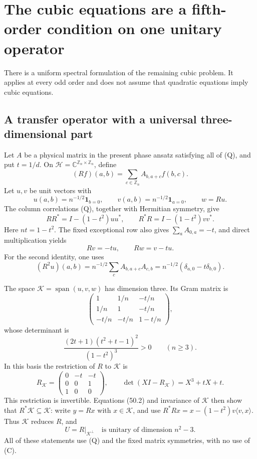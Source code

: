 \documentclass[11pt,reqno]{amsart}
\theoremstyle{plain}
\begin{document}
\section{The cubic equations are a fifth-order condition on one unitary operator}\label{sec:50}

There is a uniform spectral formulation of the remaining cubic
problem. It applies at every odd order and does not assume that
quadratic equations imply cubic equations.

\subsection{A transfer operator with a universal three-dimensional part}\label{sec:50.1}

Let \(A\) be a physical matrix in the present phase ansatz satisfying
all of (Q), and put \(t=1/d\). On
\(\mathcal H=\mathbb C^{\mathbb Z_n\times\mathbb Z_n}\), define
\begin{equation*}
 (Rf)(a,b)=\sum_{c\in\mathbb Z_n}A_{b,a+c}f(b,c).
 \tag{50.1}
\end{equation*}
Let \(u,v\) be unit vectors with
\[
 u(a,b)=n^{-1/2}\mathbf1_{b=0},
 \qquad v(a,b)=n^{-1/2}\mathbf1_{a=0},
 \qquad w=Ru.
\]
The column correlations (Q), together with Hermitian symmetry, give
\begin{equation*}
 RR^*=I-(1-t^2)uu^*,
 \qquad R^*R=I-(1-t^2)vv^*. \tag{50.2}
\end{equation*}
Here \(nt=1-t^2\). The fixed exceptional row also gives
\(\sum_a A_{0,a}=-t\), and direct multiplication yields
\begin{equation*}
 Rv=-tu,\qquad Rw=v-tu. \tag{50.3}
\end{equation*}
For the second identity, one uses
\[
 (R^2u)(a,b)=n^{-1/2}\sum_c A_{b,a+c}A_{c,b}
 =n^{-1/2}(\delta_{a,0}-t\delta_{b,0}).
\]

The space \(\mathcal K=\operatorname{span}(u,v,w)\) has dimension
three. Its Gram matrix is
\[
 \begin{pmatrix}
 1&1/n&-t/n\\
 1/n&1&-t/n\\
 -t/n&-t/n&1-t/n
 \end{pmatrix},
\]
whose determinant is
\[
 \frac{(2t+1)(t^2+t-1)^2}{(1-t^2)^3}>0
 \qquad(n\ge3).
\]
In this basis the restriction of \(R\) to \(\mathcal K\) is
\begin{equation*}
 R_{\mathcal K}=
 \begin{pmatrix}0&-t&-t\\0&0&1\\1&0&0\end{pmatrix},
 \qquad
 \det(XI-R_{\mathcal K})=X^3+tX+t. \tag{50.4}
\end{equation*}
This restriction is invertible. Equations (50.2) and invariance of
\(\mathcal K\) then show that \(R^*\mathcal K\subseteq\mathcal K\):
write \(y=Rx\) with \(x\in\mathcal K\), and use
\(R^*Rx=x-(1-t^2)v\langle v,x\rangle\).
Thus \(\mathcal K\) reduces \(R\), and
\begin{equation*}
 U=R\big|_{\mathcal K^\perp}
 \quad\text{is unitary of dimension }n^2-3. \tag{50.5}
\end{equation*}
All of these statements use (Q) and the fixed matrix symmetries,
with no use of (C).
\end{document}
